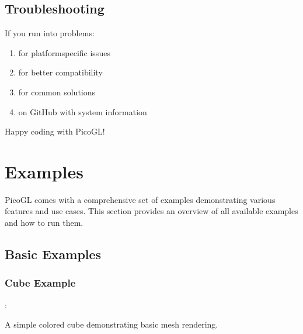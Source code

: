 \documentclass[a4paper,10pt,english,openany,oneside]{sphinxmanual}
\begin{document}
\subsection{Troubleshooting}
\label{\detokenize{quickstart:troubleshooting}}
\sphinxAtStartPar
If you run into problems:
\begin{enumerate}
%
\item {} 
\sphinxAtStartPar
{} for platform\sphinxhyphen{}specific issues

\item {} 
\sphinxAtStartPar
{} for better compatibility

\item {} 
\sphinxAtStartPar
{} for common solutions

\item {} 
\sphinxAtStartPar
{} on GitHub with system information

\end{enumerate}

\sphinxAtStartPar
Happy coding with PicoGL! 🎉

\sphinxstepscope


\section{Examples}
\label{\detokenize{examples:examples}}\label{\detokenize{examples::doc}}
\sphinxAtStartPar
PicoGL comes with a comprehensive set of examples demonstrating various features and use cases. This section provides an overview of all available examples and how to run them.


\subsection{Basic Examples}
\label{\detokenize{examples:basic-examples}}

\subsubsection{Cube Example}
\label{\detokenize{examples:cube-example}}
\sphinxAtStartPar
{}: 

\sphinxAtStartPar
A simple colored cube demonstrating basic mesh rendering.
\end{document}
